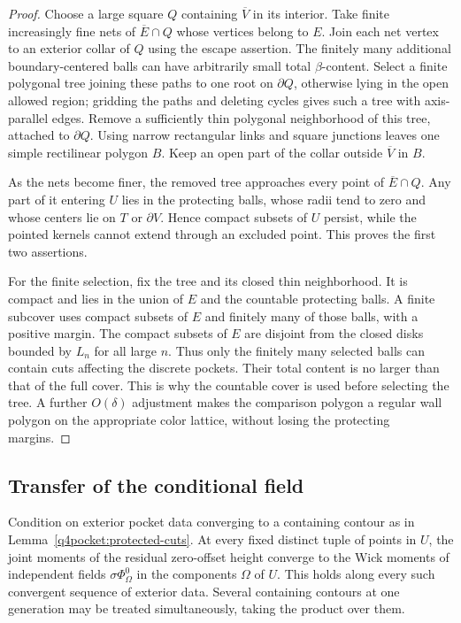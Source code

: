 \begin{proof}
Choose a large square $Q$ containing $\overline V$ in its interior.
Take finite increasingly fine nets of $\overline E\cap Q$ whose
vertices belong to $E$.  Join each net vertex to an exterior collar
of $Q$ using the escape assertion.  The finitely many additional
boundary-centered balls can have arbitrarily small total
$\beta$-content.  Select a finite polygonal tree joining these
paths to one root on $\partial Q$, otherwise lying in the open
allowed region; gridding the paths and deleting cycles gives such
a tree with axis-parallel edges.  Remove a sufficiently thin
polygonal neighborhood of this tree, attached to $\partial Q$.
Using narrow rectangular links and square junctions leaves one
simple rectilinear polygon $B$.  Keep an open part of the collar
outside $\overline V$ in $B$.

As the nets become finer, the removed tree approaches every point
of $\overline E\cap Q$.  Any part of it entering $U$ lies in the
protecting balls, whose radii tend to zero and whose centers lie
on $T$ or $\partial V$.  Hence compact subsets of $U$ persist,
while the pointed kernels cannot extend through an excluded point.
This proves the first two assertions.

For the finite selection, fix the tree and its closed thin
neighborhood.  It is compact and lies in the union of $E$ and
the countable protecting balls.  A finite subcover uses compact
subsets of $E$ and finitely many of those balls, with a positive
margin.  The compact subsets of $E$ are disjoint from the closed
disks bounded by $L_n$ for all large $n$.  Thus only the finitely
many selected balls can contain cuts affecting the discrete
pockets.  Their total content is no larger than that of the full
cover.  This is why the countable cover is used before selecting
the tree.  A further $O(\delta)$ adjustment makes the comparison
polygon a regular wall polygon on the appropriate color lattice,
without losing the protecting margins.
\end{proof}

\subsection{Transfer of the conditional field}

\begin{proposition}
\label{q4pocket:rough-transfer}
Condition on exterior pocket data converging to a containing contour
as in Lemma~\ref{q4pocket:protected-cuts}.  At every fixed distinct
tuple of points in $U$, the joint moments of the residual zero-offset
height converge to the Wick moments of independent fields
$\sigma\Phi^0_\Omega$ in the components $\Omega$ of $U$.
This holds along every such convergent sequence of exterior data.
Several containing contours at one generation may be treated
simultaneously, taking the product over them.
\end{proposition}

